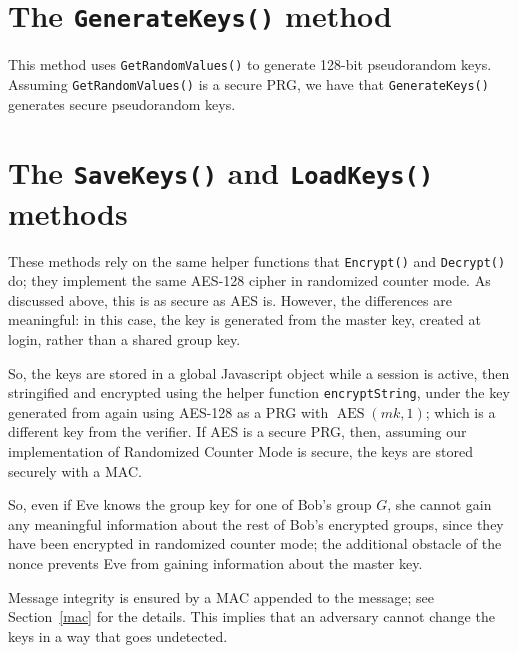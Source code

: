 \documentclass{amsart}
\DeclareMathOperator{\AES}{AES}
\begin{document}
\section{The \texttt{GenerateKeys()} method}
This method uses \verb+GetRandomValues()+ to generate 128-bit pseudorandom keys. Assuming \verb+GetRandomValues()+ is a secure PRG, we have that \texttt{GenerateKeys()} generates secure pseudorandom keys.

\section{The \texttt{SaveKeys()} and \texttt{LoadKeys()} methods}%
These methods rely on the same helper functions that \verb+Encrypt()+ and \verb+Decrypt()+ do; they implement the same AES-128 cipher in randomized counter mode. As discussed above, this is as secure as AES is. However, the differences are meaningful: in this case, the key is generated from the master key, created at login, rather than a shared group key.

So, the keys are stored in a global Javascript object while a session is active, then stringified and encrypted using the helper function \verb+encryptString+, under the key generated from again using AES-128 as a PRG with $\AES(mk, 1)$; which is a different key from the verifier. If AES is a secure PRG, then, assuming our implementation of Randomized Counter Mode is secure, the keys are stored securely with a MAC.

So, even if Eve knows the group key for one of Bob's group $G$, she cannot gain any meaningful information about the rest of Bob's encrypted groups, since they have been encrypted in randomized counter mode; the additional obstacle of the nonce prevents Eve from gaining information about the master key.

Message integrity is ensured by a MAC appended to the message; see Section~\ref{mac} for the details. This implies that an adversary cannot change the keys in a way that goes undetected.
\end{document}

